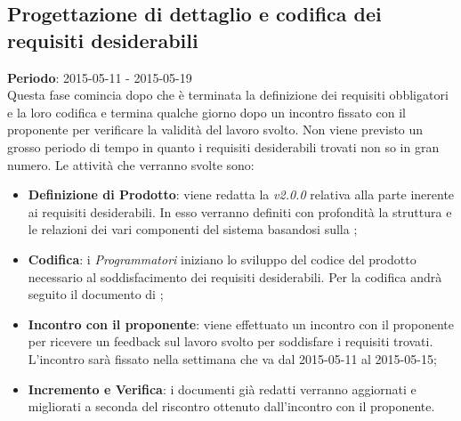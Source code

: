 	\subsection{Progettazione di dettaglio e codifica dei requisiti desiderabili} %
	\label{sub:progettazione_di_dettaglio_e_codifica_dei_requisiti_desiderabili}
	\textbf{Periodo}:  2015-05-11 - 2015-05-19 \\
	Questa fase comincia dopo che è terminata la definizione dei requisiti obbligatori e la loro codifica e termina qualche giorno dopo un incontro fissato con il proponente per verificare la validità del lavoro svolto. Non viene previsto un grosso periodo di tempo in quanto i requisiti desiderabili trovati non so in gran numero.
	Le attività che verranno svolte sono:
		\begin{itemize}
			\item \textbf{Definizione di Prodotto}: viene redatta la \docNameDdP{} \emph{v2.0.0} relativa alla parte inerente ai requisiti desiderabili. In esso verranno definiti con profondità la struttura e le relazioni dei vari componenti del sistema basandosi sulla \docNameVersionST;
			\item \textbf{Codifica}: i \emph{Programmatori} iniziano lo sviluppo del codice del prodotto necessario al soddisfacimento dei requisiti desiderabili. Per la codifica andrà seguito il documento di \docNameVersionDdP;
			\item \textbf{Incontro con il proponente}: viene effettuato un incontro con il proponente per ricevere un feedback sul lavoro svolto per soddisfare i requisiti trovati. \\
			L'incontro sarà fissato nella settimana che va dal 2015-05-11 al 2015-05-15;
			\item \textbf{Incremento e Verifica}: i documenti già redatti verranno aggiornati e migliorati a seconda del riscontro ottenuto dall'incontro con il proponente.
		\end{itemize}
		
